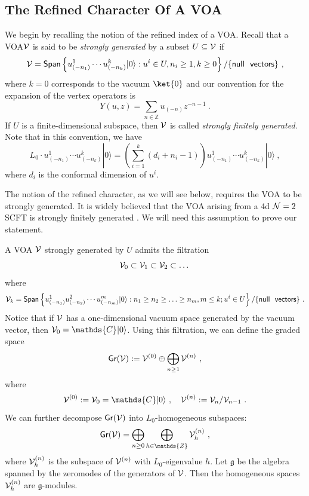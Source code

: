 \documentclass[a4paper,10pt]{article}
\newcommand{\C}{\mathds{C}}
\newcommand{\Z}{\mathds{Z}}
\newcommand{\mr}[1]{\mathsf{#1}}
\newcommand{\tsf}[1]{\textsf{#1}}
\newcommand{\mf}[1]{\mathfrak{#1}}
\def\CN {{\cal N}}
\def\CV {{\cal V}}
\begin{document}
\subsection{The Refined Character Of A \tsf{VOA}}
We begin by recalling the notion of the refined index of a \tsf{VOA}. Recall that a \tsf{VOA}$\CV$ is said to be \textit{strongly generated} by a subset $U\subseteq \CV$ if  
\begin{equation}
    \CV=\mathsf{Span}\left\{u^1_{(-n_1)}\cdots u^k_{(-n_k)}|0\rangle:u^i\in U,n_i\geq 1,k\geq 0\right\}/\{\mr{null~~ vectors}\}~,
\end{equation}
where $k=0$ corresponds to the vacuum $\ket{0}$ and our convention for the expansion of the vertex operators is 
\begin{equation}
    Y(u,z)=\sum_{n\in\Z}u_{(-n)}z^{-n-1}~.
\end{equation}
If $U$ is a finite-dimensional subspace, then $\CV$ is called \textit{strongly finitely generated}. Note that in this convention, we have 
\begin{equation}
    L_0\cdot u^1_{(-n_1)}\cdots u^k_{(-n_k)}|0\rangle=\left(\sum_{i=1}^k(d_i+n_i-1)\right)u^1_{(-n_1)}\cdots u^k_{(-n_k)}|0\rangle~,
\end{equation}
where $d_i$ is the conformal dimension of $u^i$.


The notion of the refined character, as we will see below, requires the \tsf{VOA} to be strongly generated. It is widely believed that the \tsf{VOA} arising from a 4d $\CN=2$ \tsf{SCFT} is strongly finitely generated \cite{Beem:2019tfp,Arakawa:2016hkg}. We will need this assumption to prove our statement.

A \tsf{VOA} $\CV$ strongly generated by $U$ admits the filtration
\begin{equation}
    \CV_0\subset\CV_1\subset\CV_2\subset\dots
\end{equation}
where 
\begin{equation}
    \CV_k=\mr{Span}\left\{u_{(-n_1)}^{1} u_{(-n_2)}^{2} \cdots u_{(-n_m)}^{m}|0\rangle: n_1 \geq n_2 \geq \ldots \geq n_m, m \leq k;u^i\in U\right\}/\{\mr{null~~ vectors}\}~.
\end{equation}
Notice that if $\CV$ has a one-dimensional vacuum space generated by the vacuum vector, then $\CV_0=\C|0\rangle$. 
Using this filtration, we can define the graded space 
\begin{equation}
    \mr{Gr}(\CV):=\CV^{(0)}\oplus\bigoplus_{n\geq 1}\CV^{(n)}~,
\end{equation}
where 
\begin{equation}
\CV^{(0)}:=\CV_0=\C|0\rangle~,\quad \CV^{(n)}:=\CV_n/\CV_{n-1}~.   
\end{equation}
We can further decompose $\mr{Gr}(\CV)$ into $L_0$-homogeneous subspaces:
\begin{equation}
\mr{Gr}(\CV)=\bigoplus_{n\geq 0}\bigoplus_{h\in\Z}\CV^{(n)}_h~,    
\end{equation}
where $\CV^{(n)}_h$ is the subspace of $\CV^{(n)}$ with $L_0$-eigenvalue $h$. 
Let $\mf{g}$ be the algebra spanned by the zeromodes of the generators of $\CV$. Then the homogeneous spaces $\CV^{(n)}_h$ are $\mf{g}$-modules. 
\end{document}
